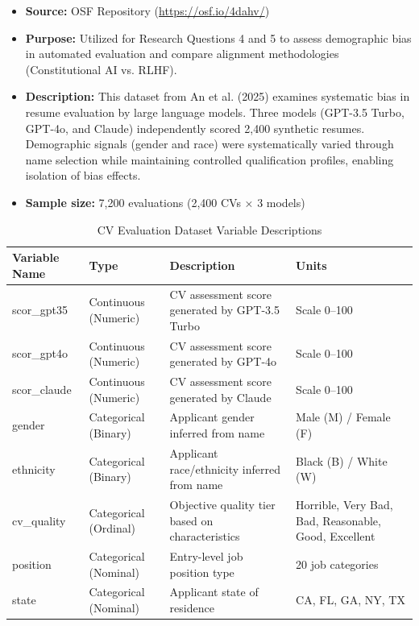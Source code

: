 \documentclass{article}
\begin{document}
\begin{itemize}[noitemsep]
    \item \textbf{Source:} OSF Repository (\url{https://osf.io/4dahv/})
    
    \item \textbf{Purpose:} Utilized for Research Questions 4 and 5 to assess demographic bias in automated evaluation and compare alignment methodologies (Constitutional AI vs. RLHF).
    
    \item \textbf{Description:} This dataset from An et al. (2025) examines systematic bias in resume evaluation by large language models. Three models (GPT-3.5 Turbo, GPT-4o, and Claude) independently scored 2,400 synthetic resumes. Demographic signals (gender and race) were systematically varied through name selection while maintaining controlled qualification profiles, enabling isolation of bias effects.
    
    \item \textbf{Sample size:} 7,200 evaluations (2,400 CVs × 3 models)
\end{itemize}

\begin{table}[H]
\centering
\caption{CV Evaluation Dataset Variable Descriptions}
\label{tab:variables}
\begin{tabular}{|l|l|p{5.5cm}|p{4cm}|}
\hline
\textbf{Variable Name} & \textbf{Type} & \textbf{Description} & \textbf{Units} \\ \hline
scor\_gpt35 & Continuous (Numeric) & CV assessment score generated by GPT-3.5 Turbo & Scale 0--100 \\ \hline
scor\_gpt4o & Continuous (Numeric) & CV assessment score generated by GPT-4o & Scale 0--100 \\ \hline
scor\_claude & Continuous (Numeric) & CV assessment score generated by Claude & Scale 0--100 \\ \hline
gender & Categorical (Binary) & Applicant gender inferred from name & Male (M) / Female (F) \\ \hline
ethnicity & Categorical (Binary) & Applicant race/ethnicity inferred from name & Black (B) / White (W) \\ \hline
cv\_quality & Categorical (Ordinal) & Objective quality tier based on characteristics & Horrible, Very Bad, Bad, Reasonable, Good, Excellent \\ \hline
position & Categorical (Nominal) & Entry-level job position type & 20 job categories \\ \hline
state & Categorical (Nominal) & Applicant state of residence & CA, FL, GA, NY, TX \\ \hline
\end{tabular}
\end{table}
\end{document}
